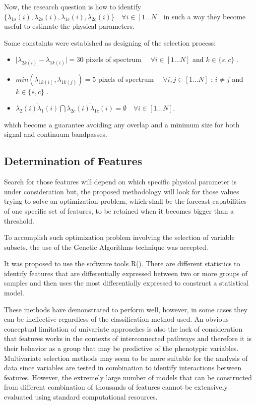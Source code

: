 {{
Now, the research question is how to identify 
$\{\lambda_{1s}(i),\lambda_{2s}(i), \lambda_{1c}(i),\lambda_{2c}(i)\}  \quad \forall i \in [1 \ldots N] $
in such a way they become useful to estimate the physical parameters.

Some constaints were estabished as designing of the selection process:

\begin{itemize}
 \item { $ \vert \lambda_{2k(i)} - \lambda_{1k(i)} \vert = 30 $ pixels of spectrum $ \quad \forall i \in [1 \ldots N]$ and $ k \in \{s,c\} $ .}
 \item { $ min ( \lambda_{1k(i)}, \lambda_{1k(j)} ) = 5 $ pixels of spectrum $ \quad \forall i,j \in [1 \ldots N] $ ; $ i \neq j $ and $ k \in \{s,c\} $ .}
 \item { $ \overline{\lambda_{2}(i)\lambda_{1}(i)}  \bigcap 
                      \overline{\lambda_{2c}(i)\lambda_{1c}(i)} = \emptyset \quad \forall i \in [1 \ldots N]$.}
\end{itemize}

which become a guarantee avoiding any overlap 
and a minimum size for both signal and continuum bandpasses.
}

\subsection{Determination of Features}
\label{subsec:DF}
{
Search for those features will depend on which specific physical parameter is 
under consideration but, the proposed methodology will look for those values 
trying to solve an optimization problem, which shall be the forecast capabilities
of one specific set of features, to be retained when it becomes bigger than 
a threshold.

To accomplish such optimization problem involving the selection of variable 
subsets, the use of the Genetic Algorithms technique was accepted. 
}

{
It was proposed to use the software tools R(\cite{R2013}).
There are different statistics to identify features 
that are differentially expressed between
two or more groups of samples and then uses the most differentially
expressed to construct a statistical model.
}

{
These methods have 
demonstrated to perform well, however, in some cases they can be ineffective
regardless of the classification method used. An obvious conceptual limitation
of univariate approaches is also the lack of consideration that features works in
the contexts of interconnected pathways and therefore it is their behavior as
a group that may be predictive of the phenotypic variables. Multivariate
selection methods may seem to be more suitable for the analysis of 
data since variables are tested in
combination to identify interactions between features. However, the extremely
large number of models that can be constructed from different combination of
thousands of features cannot be extensively evaluated using standard
computational resources.
}

}
